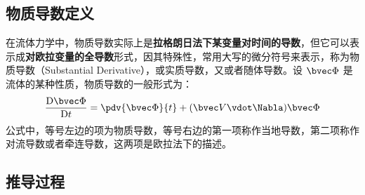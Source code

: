 
\begin{issues}
\issueDraft
\end{issues}

\subsection{物质导数定义}

在流体力学中，物质导数实际上是\textbf{拉格朗日法下某变量对时间的导数}，但它可以表示成\textbf{对欧拉变量的全导数}形式，因其特殊性，常用大写的微分符号来表示，称为物质导数（Substantial  Derivative），或实质导数，又或者随体导数。设 $\bvec \Phi$ 是流体的某种性质，物质导数的一般形式为：
\begin{equation}
\frac{\mathrm{D}\bvec \Phi }{\mathrm{D} t}=\pdv{\bvec \Phi}{t}+(\bvec V \vdot \Nabla)\bvec \Phi
\end{equation}
公式中，等号左边的项为物质导数，等号右边的第一项称作当地导数，第二项称作对流导数或者牵连导数，这两项是欧拉法下的描述。

\subsection{推导过程}
